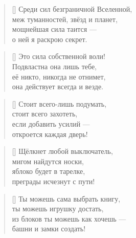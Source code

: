 \documentclass[a5paper,11pt]{memoir}
\begin{document}
\newpage
\PlainPoemTitle
{}
\vspace{2cm}
\begin{verse}[\versewidth]
\hspace{1.5cm}Среди сил безграничной Вселенной, \\
\hspace{1.5cm}меж туманностей, звёзд и планет, \\
\hspace{1.5cm}мощнейшая сила таится --- \\ 
\hspace{1.5cm}о ней я раскрою секрет.
\end{verse}

\begin{verse}[\versewidth]
\hspace{1.5cm}Это сила собственной воли! \\
\hspace{1.5cm}Подвластна она лишь тебе, \\
\hspace{1.5cm}её никто, никогда не отнимет, \\
\hspace{1.5cm}она действует всегда и везде.
\end{verse}

\begin{verse}[\versewidth]
\hspace{1.5cm}Стоит всего-лишь подумать, \\
\hspace{1.5cm}стоит всего захотеть, \\
\hspace{1.5cm}если добавить усилий --- \\ 
\hspace{1.5cm}откроется каждая дверь!
\end{verse}

\begin{verse}[\versewidth]
\hspace{1.5cm}Щёлкнет любой выключатель, \\
\hspace{1.5cm}мигом найдутся носки, \\
\hspace{1.5cm}яблоко будет в тарелке, \\
\hspace{1.5cm}преграды исчезнут с пути!
\end{verse}

\begin{verse}[\versewidth]
\hspace{1.5cm}Ты можешь сама выбрать книгу, \\
\hspace{1.5cm}ты можешь игрушку достать, \\
\hspace{1cm}из блоков ты можешь как хочешь --- \\
\hspace{1cm}башни и замки создать!
\end{verse}
\end{document}
